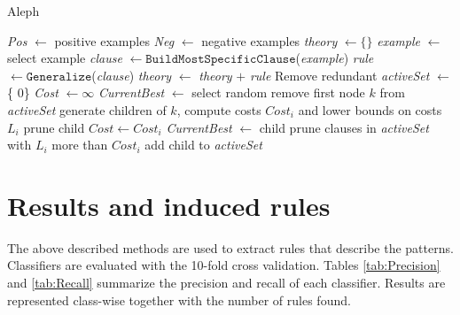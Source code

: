 \begin{algorithm}
	\caption{Aleph}
	\label{alg:Aleph}
	\begin{algorithmic}[1]
			\State \textit{Pos} $\gets$ positive examples
			\State \textit{Neg} $\gets$ negative examples
			\State \textit{theory} $\gets \{ \}$
				\State \textit{example} $\gets$ select example
				\State \textit{clause} $\gets \mathtt{BuildMostSpecificClause}$(\textit{example}) 
				\State \textit{rule} $\gets \mathtt{Generalize}$(\textit{clause})
				\State \textit{theory} $\gets$ \textit{theory} $+$ \textit{rule}
				\State Remove redundant
			\EndWhile
		\EndFunction
		\Statex
			\State \textit{activeSet} $\gets$ \{ 0\}
			\State \textit{Cost} $\gets \infty $
			\State \textit{CurrentBest} $\gets$ select random
				\State remove first node $k$ from \textit{activeSet}
				\State generate children of $k$, compute costs $Cost_i$ and lower bounds on costs $L_i$
						\State prune child
					\Else						
							\State $Cost \gets Cost_i$
							\State \textit{CurrentBest} $\gets$ child
							\State prune clauses in \textit{activeSet} with $L_i$ more than $Cost_i$ 
						\EndIf
						\State add child to \textit{activeSet}
					\EndIf
				\EndFor
			\EndWhile 
		\EndFunction
	\end{algorithmic}
\end{algorithm}


\section{Results and induced rules}

The above described methods are used to extract rules that describe the patterns. Classifiers are evaluated with the 10-fold cross validation. Tables \ref{tab:Precision} and \ref{tab:Recall} summarize the precision and recall of each classifier. Results are represented class-wise together with the number of rules found. \\

